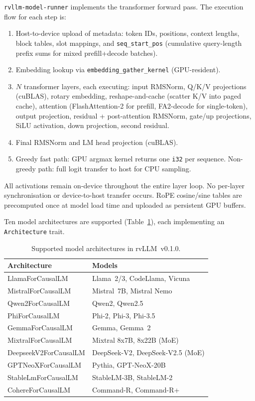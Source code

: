 \documentclass[11pt,a4paper]{article}
\newcommand{\thead}[1]{\textbf{#1}}
\begin{document}
\texttt{rvllm-model-runner} implements the transformer forward pass. The execution
flow for each step is:
\begin{enumerate}
  \item Host-to-device upload of metadata: token IDs, positions, context lengths,
        block tables, slot mappings, and \texttt{seq\_start\_pos} (cumulative
        query-length prefix sums for mixed prefill+decode batches).
  \item Embedding lookup via \texttt{embedding\_gather\_kernel} (GPU-resident).
  \item $N$ transformer layers, each executing: input RMSNorm, Q/K/V projections
        (cuBLAS), rotary embedding, reshape-and-cache (scatter K/V into paged cache),
        attention (FlashAttention-2 for prefill, FA2-decode for single-token), output
        projection, residual + post-attention RMSNorm, gate/up projections,
        SiLU activation, down projection, second residual.
  \item Final RMSNorm and LM head projection (cuBLAS).
  \item Greedy fast path: GPU argmax kernel returns one \texttt{i32} per sequence.
        Non-greedy path: full logit transfer to host for CPU sampling.
\end{enumerate}

All activations remain on-device throughout the entire layer loop. No per-layer
synchronisation or device-to-host transfer occurs. RoPE cosine/sine tables are
precomputed once at model load time and uploaded as persistent GPU buffers.

Ten model architectures are supported (Table~\ref{tab:architectures}), each
implementing an \texttt{Architecture} trait.

\begin{table}[t]
  \centering
  \caption{Supported model architectures in rvLLM~v0.1.0.}
  \label{tab:architectures}
  \small
  \begin{tabular}{@{}ll@{}}
    \toprule
    \rowcolor{HeaderBlue} \thead{Architecture} & \thead{Models} \\
    \midrule
    LlamaForCausalLM      & Llama~2/3, CodeLlama, Vicuna \\
    \rowcolor{gray!8}
    MistralForCausalLM     & Mistral~7B, Mistral Nemo \\
    Qwen2ForCausalLM       & Qwen2, Qwen2.5 \\
    \rowcolor{gray!8}
    PhiForCausalLM         & Phi-2, Phi-3, Phi-3.5 \\
    GemmaForCausalLM       & Gemma, Gemma~2 \\
    \rowcolor{gray!8}
    MixtralForCausalLM     & Mixtral 8x7B, 8x22B (MoE) \\
    DeepseekV2ForCausalLM  & DeepSeek-V2, DeepSeek-V2.5 (MoE) \\
    \rowcolor{gray!8}
    GPTNeoXForCausalLM     & Pythia, GPT-NeoX-20B \\
    StableLmForCausalLM    & StableLM-3B, StableLM-2 \\
    \rowcolor{gray!8}
    CohereForCausalLM      & Command-R, Command-R+ \\
    \bottomrule
  \end{tabular}
\end{table}
\end{document}
